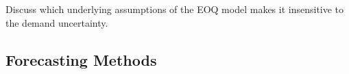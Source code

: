 \begin{exercise}

\end{exercise}

\begin{exercise}
Discuss which underlying assumptions of the EOQ model makes it insensitive to the demand uncertainty. 

\end{exercise}


\subsection{Forecasting Methods}

